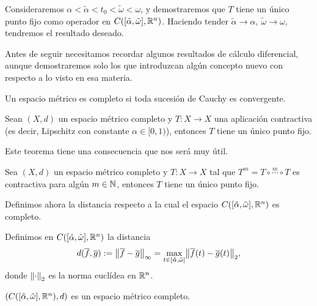 \documentclass[../ecuaciones_diferenciales.tex]{subfiles}
\begin{document}
Consideraremos \(\alpha < \tilde{\alpha} < t_0 < \tilde{\omega} < \omega\), y
demostraremos que \(T\) tiene un único punto fijo como operador en
\(C([\tilde{\alpha}, \tilde{\omega}], \mathbb{R}^n)\). Haciendo tender \(\tilde{\alpha}
\to \alpha,\ \tilde{\omega} \to \omega\), tendremos el resultado deseado.

Antes de seguir necesitamos recordar algunos resultados de cálculo diferencial,
aunque demostraremos solo los que introduzcan algún concepto nuevo con respecto 
a lo visto en esa materia.

\begin{definition}
	Un espacio métrico es completo si toda sucesión de Cauchy es convergente.
\end{definition}

\begin{theorem}
	Sean \((X, d)\) un espacio métrico completo y \(T : X \to X\) una aplicación
	contractiva (es decir, Lipschitz con constante \(\alpha \in [0, 1)\)), 
	entonces \(T\) tiene un único punto fijo.
\end{theorem}

Este teorema tiene una consecuencia que nos será muy útil.

\begin{corollary} \label{cor:banach_fixed_point}
	Sea \((X, d)\) un espacio métrico completo y \(T : X \to X\) tal que
	\(T^m = T \circ \overset{m}{\cdots} \circ T\) es contractiva para algún
	\(m \in \mathbb{N}\), entonces \(T\) tiene un único punto fijo.
\end{corollary}

Definimos ahora la distancia respecto a la cual el espacio 
\(C([\tilde{\alpha}, \tilde{\omega}], \mathbb{R}^n)\) es completo.

\begin{definition}
	Definimos en \(C([\tilde{\alpha}, \tilde{\omega}], \mathbb{R}^n)\) la distancia
	\[d(\vec{f}, \vec{g}) := \norm{\vec{f} - \vec{g}}_{\infty} 
		= \max_{t \in [\tilde{\alpha}, \tilde{\omega}]} 
			\norm{\vec{f}(t) - \vec{g}(t)}_2,\]
	donde \(\norm{\cdot}_2\) es la norma euclídea en \(\mathbb{R}^n\). 
\end{definition}

\begin{proposition}
	\((C([\tilde{\alpha}, \tilde{\omega}], \mathbb{R}^n), d)\) 
	es un espacio métrico completo.
\end{proposition}
\end{document}
